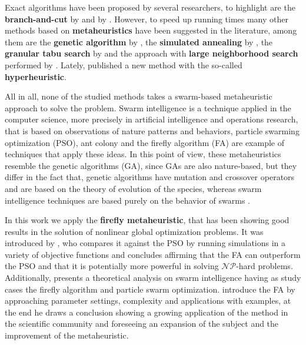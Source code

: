 \documentclass[tuberlin,cic,tc,openright,english,noabntcite,oneside]{iiufrgs}
\begin{document}
Exact algorithms have been proposed by several researchers, to highlight are the \textbf{branch-and-cut} by \textcite{cordeau_branch-and-cut_2006} and by \textcite{ropke_models_2007}. However, to speed up running times many other methods based on \textbf{metaheuristics} have been suggested in the literature, among them are the \textbf{genetic algorithm} by \textcite{jorgensen_solving_2007}, the \textbf{simulated annealing} by \cite{zidi_multi-objective_2012}, the \textbf{granular tabu search} by \textcite{kirchler_granular_2013} and the approach with \textbf{large neighborhood search} performed by \textcite{parragh_hybrid_2013}. Lately, \cite{urra_hyperheuristic_2015} published a new method with the so-called \textbf{hyperheuristic}.

All in all, none of the studied methods takes a swarm-based metaheuristic approach to solve the problem. Swarm intelligence is a technique applied in the computer science, more precisely in artificial intelligence and operations research, that is based on observations of nature patterns and behaviors, particle swarming optimization (PSO), ant colony and the firefly algorithm (FA) are example of techniques that apply these ideas. In this point of view, these metaheuristics resemble the genetic algorithms (GA), since GAs are also nature-based, but they differ in the fact that, genetic algorithms have mutation and crossover operators and are based on the theory of evolution of the species, whereas swarm intelligence techniques are based purely on the behavior of swarms \parencite[p. 189-190]{yang_efficiency_2012}.

In this work we apply the \textbf{firefly metaheuristic}, that has been showing good results in the solution of nonlinear global optimization problems. It was introduced by \textcite{yang_firefly_2009}, who compares it against the PSO by running simulations in a variety of objective functions and concludes affirming that the FA can outperform the PSO and that it is potentially more powerful in solving $\mathcal{NP}$-hard problems. Additionally, \textcite{yang_efficiency_2012} presents a theoretical analysis on swarm intelligence having as study cases the firefly algorithm and particle swarm optimization. \textcite{yang_firefly_2013} introduce the FA by approaching parameter settings, complexity and applications with examples, at the end he draws a conclusion showing a growing application of the method in the scientific community and foreseeing an expansion of the subject and the improvement of the metaheuristic.
\end{document}
